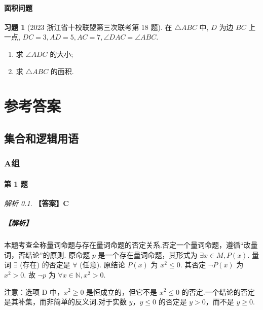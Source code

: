 \documentclass[12pt,a4paper]{ctexbook}
\theoremstyle{definition}
\newtheorem{exercise}{习题}
\theoremstyle{remark}
\newtheorem*{solution}{解析}
\begin{document}
	\subsubsection{面积问题}
	\begin{exercise}[2023 浙江省十校联盟第三次联考第 18 题]\label{ex:zhejiang2023_18}
		在 $\triangle ABC$ 中, $D$ 为边 $BC$ 上一点, $DC = 3, AD = 5, AC = 7, \angle DAC = \angle ABC$.
		\begin{enumerate}
			\item[(1)] 求 $\angle ADC$ 的大小;
			\item[(2)] 求 $\triangle ABC$ 的面积.
		\end{enumerate}
		\end{exercise}
	
	\chapter*{参考答案}
	\section{集合和逻辑用语}
	
	\subsection*{A组}
	
	\subsubsection*{第 1 题}
	\begin{solution}
		\textbf{【答案】C}
		\paragraph{【解析】}
		本题考查全称量词命题与存在量词命题的否定关系.否定一个量词命题，遵循“改量词，否结论”的原则.
		原命题 $p$ 是一个存在量词命题，其形式为 $\exists x \in M, P(x)$.
		量词 $\exists$ (存在) 的否定是 $\forall$ (任意).
		原结论 $P(x)$ 为 $x^2 \le 0$. 其否定 $\neg P(x)$ 为 $x^2 > 0$.
		故 $\neg p$ 为 $\forall x \in \mathbb{N}, x^2 > 0$.
	\end{solution}
	
	注意：选项 D 中，$x^2 \ge 0$ 是恒成立的，但它不是 $x^2 \le 0$ 的否定.一个结论的否定是其补集，而非简单的反义词.对于实数 $y$，$y \le 0$ 的否定是 $y>0$，而不是 $y \ge 0$.
	
\end{document}
